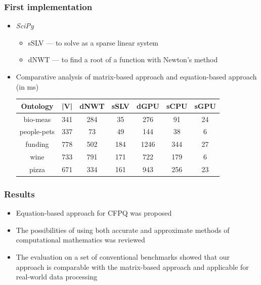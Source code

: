 \documentclass[aspectratio=169,xcolor=table]{beamer}
\begin{document}
\begin{frame}[fragile]
   
  \frametitle{First implementation}

\begin{itemize}
    \item \textit{SciPy}
    \begin{itemize}
        \item sSLV --- to solve as a sparse linear system
        \item dNWT --- to find a root of a function with Newton's method
    \end{itemize}
    \item Comparative analysis of matrix-based approach and equation-based approach (in ms)

        \begin{table}[h]
        \centering
        \begin{tabular}{ | c | c || c | c || c | c | c |}
        \hline
        Ontology    & |V| & dNWT & sSLV & dGPU & sCPU &  sGPU \\
        \hline
        \hline
        bio-meas    & 341 &  284 & 35   & 276  & 91  & 24\\
        people-pets & 337 &  73  & 49   & 144  & 38  & 6\\
        funding     & 778 &  502 & 184  & 1246 & 344 & 27\\
        wine        & 733 &  791 & 171  & 722  & 179 & 6\\
        pizza       & 671 &  334 & 161  & 943  & 256 & 23\\
        \hline
        \end{tabular}
        
        \end{table}

\end{itemize}
\end{frame}



\begin{frame}[fragile]
   
  \frametitle{Results}
  
\begin{itemize}

  \item Equation-based approach for CFPQ was proposed
  \item The possibilities of using both accurate and approximate methods of computational mathematics was reviewed
  \item The evaluation on a set of conventional benchmarks showed that our approach is comparable with the matrix-based approach and applicable for real-world data processing
  
\end{itemize}

\end{frame}
\end{document}
